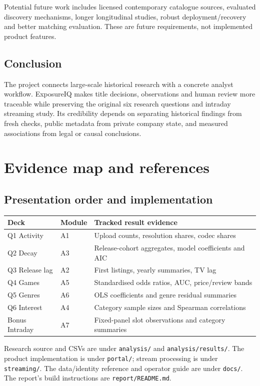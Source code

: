 \documentclass[11pt,a4paper]{article}
\newcommand{\code}[1]{{\small\nolinkurl{#1}}}
\newcommand{\chapterpage}[1]{\clearpage\section{#1}}
\begin{document}
Potential future work includes licensed contemporary catalogue sources,
evaluated discovery mechanisms, longer longitudinal studies, robust
deployment/recovery and better matching evaluation. These are future
requirements, not implemented product features.

\subsection{Conclusion}
The project connects large-scale historical research with a concrete
analyst workflow. ExposureIQ makes title decisions, observations and human
review more traceable while preserving the original six research questions
and intraday streaming study. Its credibility depends on separating
historical findings from fresh checks, public metadata from private company
state, and measured associations from legal or causal conclusions.

\chapterpage{Evidence map and references}
\subsection{Presentation order and implementation}
\begin{tabularx}{\linewidth}{@{}llY@{}}
\toprule
\textbf{Deck} & \textbf{Module} & \textbf{Tracked result evidence}\\
\midrule
Q1 Activity & A1 & Upload counts, resolution shares, codec shares\\
Q2 Decay & A3 & Release-cohort aggregates, model coefficients and AIC\\
Q3 Release lag & A2 & First listings, yearly summaries, TV lag\\
Q4 Games & A5 & Standardised odds ratios, AUC, price/review bands\\
Q5 Genres & A6 & OLS coefficients and genre residual summaries\\
Q6 Interest & A4 & Category sample sizes and Spearman correlations\\
Bonus Intraday & A7 & Fixed-panel slot observations and category summaries\\
\bottomrule
\end{tabularx}

Research source and CSVs are under \code{analysis/} and
\code{analysis/results/}. The product implementation is under \code{portal/};
stream processing is under \code{streaming/}. The data/identity reference
and operator guide are under \code{docs/}. The report's build instructions
are \code{report/README.md}.
\end{document}
